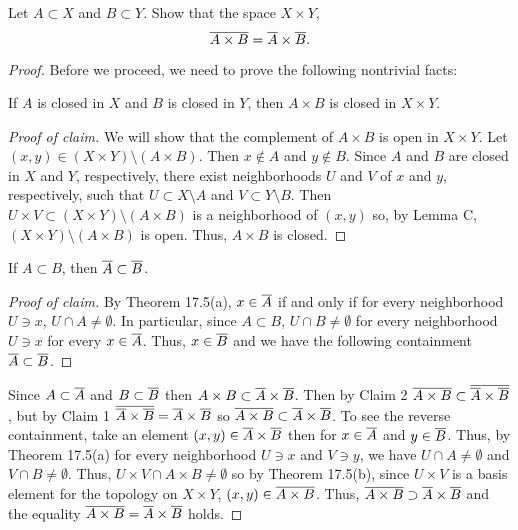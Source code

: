 \begin{problem}
Let $A\subset X$ and $B\subset Y$. Show that the space $X\times Y$,
\[\overline{A\times B}=\overline{A}\times\overline{B}.\]
\end{problem}
\begin{proof}
Before we proceed, we need to prove the following nontrivial facts:
\begin{claim}[Munkres \S17, Ex.\,3]
If $A$ is closed in $X$ and $B$ is closed in $Y$, then $A\times
B$ is closed in $X\times Y$.
\end{claim}
\begin{proof}[Proof of claim]
\renewcommand\qedsymbol{$\clubsuit$}
We will show that the complement of $A\times B$ is open in
$X\times Y$. Let $(x,y)\in (X\times Y)\setminus(A\times B)$. Then
$x\notin A$ and $y\notin B$. Since $A$ and $B$ are closed in $X$
and $Y$, respectively, there exist neighborhoods $U$ and $V$ of
$x$ and $y$, respectively, such that $U\subset X\setminus A$ and
$V\subset Y\setminus B$. Then $U\times V\subset (X\times
Y)\setminus(A\times B)$ is a neighborhood of $(x,y)$ so, by Lemma
C, $(X\times Y)\setminus(A\times B)$ is open. Thus, $A\times B$
is closed.
\end{proof}
\begin{claim}[Munkres \S17, Ex.\,6(a)]
If $A\subset B$, then $\overline{A}\subset\overline{B}$.
\end{claim}
\begin{proof}[Proof of claim]
\renewcommand\qedsymbol{$\clubsuit$}
By Theorem 17.5(a), $x\in\overline{A}$ if and only if for every
neighborhood $U\ni x$, $U\cap A\neq\emptyset$. In particular,
since $A\subset B$, $U\cap B\neq\emptyset$ for every neighborhood
$U\ni x$ for every $x\in\overline{A}$. Thus, $x\in\overline{B}$ and we have
the following containment $\overline{A}\subset\overline{B}$.
\end{proof}
\noindent
Since $A\subset\overline{A}$ and $B\subset\overline{B}$ then $A\times
B\subset\overline{A}\times\overline{B}$. Then by Claim 2
$\overline{A\times B}\subset\overline{\overline{A}\times\overline{B}}$, but by
Claim 1 $\overline{\overline{A}\times\overline{B}}=\overline{A}\times\overline{B}$ so
$\overline{A\times B}\subset\overline{A}\times\overline{B}$. To see the reverse
containment, take an element $(x,y)\in \overline{A}\times\overline{B}$ then
for $x\in\overline{A}$ and $y\in\overline{B}$. Thus, by Theorem 17.5(a) for
every neighborhood $U\ni x$ and $V\ni y$, we have $U\cap
A\neq\emptyset$ and $V\cap B\neq\emptyset$. Thus, $U\times V\cap
A\times B\neq\emptyset$ so by Theorem 17.5(b), since $U\times V$
is a basis element for the topology on $X\times Y$,
$(x,y)\in\overline{A\times B}$. Thus, $\overline{A\times B}\supset\overline{A}\times\overline{B}$ and the equality $\overline{A\times B}=\overline{A}\times\overline{B}$ holds.
\end{proof}
